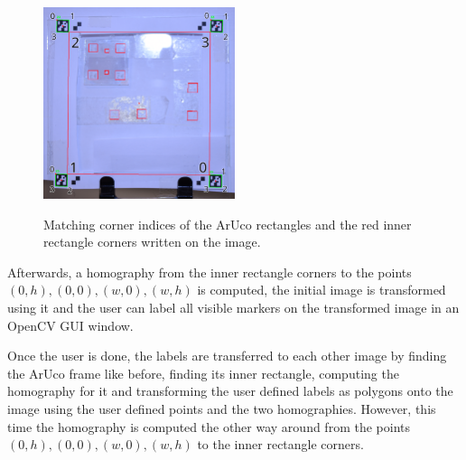 \documentclass[10pt]{book}
\newenvironment{code}{\captionsetup{type=listing}}{}
\begin{document}
\begin{figure}
  \caption{Matching corner indices of the \ac{ArUco} rectangles and the red inner rectangle corners written on the image.}
  \includegraphics[width=0.5\textwidth]{image/af_markings_3}
  \label{fig:inner_rect_indices}
\end{figure}


                
        

Afterwards, a homography from the inner rectangle corners to the points $(0,h), (0,0), (w,0), (w,h)$ is computed, the initial image is transformed using it and the user can label all visible markers on the transformed image in an \ac{OpenCV} \ac{GUI} window.

Once the user is done, the labels are transferred to each other image by finding the \ac{ArUco} frame like before, finding its inner rectangle, computing the homography for it and transforming the user defined labels as polygons onto the image using the user defined points and the two homographies. However, this time the homography is computed the other way around from the points $(0,h), (0,0), (w,0), (w,h)$ to the inner rectangle corners.
\end{document}

